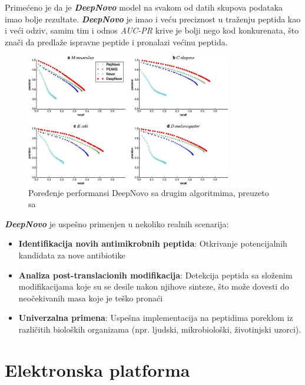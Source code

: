 \documentclass[12pt,oneside]{memoir}
\begin{document}
Primećeno je da je \textbf{\emph{DeepNovo}} model na svakom od datih skupova podataka imao bolje rezultate. \textbf{\emph{DeepNovo}} je imao i veću preciznost u traženju peptida kao i veći odziv, samim tim i odnos \emph{AUC-PR} krive je bolji nego kod konkurenata, što znači da predlaže ispravne peptide i pronalazi većinu peptida.

\begin{figure}[h]
\centering
\includegraphics[width=0.8\textwidth]{images/deep_novo_comparison.jpeg}
\caption{Poređenje performansi DeepNovo sa drugim algoritmima, preuzeto sa \cite{deepnovo}}
\label{fig:performanse}
\end{figure}

\textbf{\emph{DeepNovo}} je uspešno primenjen u nekoliko realnih scenarija:

\begin{itemize}
\item \textbf{Identifikacija novih antimikrobnih peptida}: Otkrivanje potencijalnih kandidata za nove antibiotike
\item \textbf{Analiza post-translacionih modifikacija}: Detekcija peptida sa složenim modifikacijama koje su se desile nakon njihove sinteze, što može dovesti do neočekivanih masa koje je teško pronaći
\item \textbf{Univerzalna primena}: Uspešna implementacija na peptidima poreklom iz različitih bioloških organizama (npr. ljudski, mikrobiološki, životinjski uzorci).
\end{itemize}


\chapter{Elektronska platforma}
\end{document}
